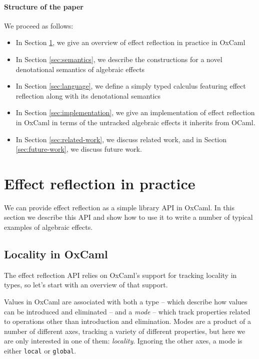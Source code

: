 \documentclass[acmsmall, screen, nonacm]{acmart}
\begin{document}
\paragraph{Structure of the paper} We proceed as follows:
\begin{itemize}
\item In Section \ref{sec:pracice}, we give an overview of effect reflection in
  practice in OxCaml
\item In Section \ref{sec:semantics}, we describe the constructions for a
  novel denotational semantics of algebraic effects
\item In Section \ref{sec:language}, we define a simply typed calculus featuring
  effect reflection along with its denotational semantics
\item In Section \ref{sec:implementation}, we give an implementation of effect
  reflection in OxCaml in terms of the untracked algebraic effects it
  inherits from OCaml.
\item In Section \ref{sec:related-work}, we discuss related work, and in
  Section \ref{sec:future-work}, we discuss future work.
\end{itemize}

\section{Effect reflection in practice}
\label{sec:pracice}

We can provide effect reflection as a simple library API in OxCaml. In
this section we describe this API and show how to use it to write a
number of typical examples of algebraic effects.

\subsection{Locality in OxCaml}

The effect reflection API relies on OxCaml's support for tracking
locality in types, so let's start with an overview of that support.

Values in OxCaml are associated with both a type -- which describe how
values can be introduced and eliminated -- and a \emph{mode} -- which
track properties related to operations other than introduction and
elimination. Modes are a product of a number of different axes, tracking
a variety of different properties, but here we are only interested in
one of them: \emph{locality}. Ignoring the other axes, a mode is either
\lstinline[style=ocaml]{local} or \lstinline[style=ocaml]{global}.
\end{document}
